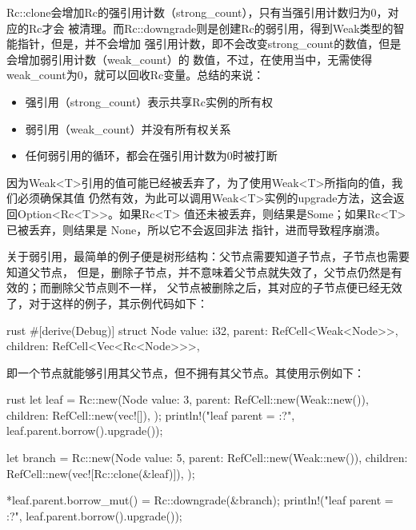 Rc::clone会增加Rc的强引用计数（strong\_count），只有当强引用计数归为0，对应的Rc才会
被清理。而Rc::downgrade则是创建Rc的弱引用，得到Weak类型的智能指针，但是，并不会增加
强引用计数，即不会改变strong\_count的数值，但是会增加弱引用计数（weak\_count）的
数值，不过，在使用当中，无需使得weak\_count为0，就可以回收Rc变量。总结的来说：
\begin{itemize}
  \item 强引用（strong\_count）表示共享Rc实例的所有权
  \item 弱引用（weak\_count）并没有所有权关系
  \item 任何弱引用的循环，都会在强引用计数为0时被打断
\end{itemize}

因为Weak<T>引用的值可能已经被丢弃了，为了使用Weak<T>所指向的值，我们必须确保其值
仍然有效，为此可以调用Weak<T>实例的upgrade方法，这会返回Option<Rc<T>>。如果Rc<T>
值还未被丢弃，则结果是Some；如果Rc<T>已被丢弃，则结果是 None，所以它不会返回非法
指针，进而导致程序崩溃。

关于弱引用，最简单的例子便是树形结构：父节点需要知道子节点，子节点也需要知道父节点，
但是，删除子节点，并不意味着父节点就失效了，父节点仍然是有效的；而删除父节点则不一样，
父节点被删除之后，其对应的子节点便已经无效了，对于这样的例子，其示例代码如下：
\begin{code-block}{rust}
#[derive(Debug)]
struct Node {
    value: i32,
    parent: RefCell<Weak<Node>>,
    children: RefCell<Vec<Rc<Node>>>,
}
\end{code-block}
即一个节点就能够引用其父节点，但不拥有其父节点。其使用示例如下：
\begin{code-block}{rust}
let leaf = Rc::new(Node {
    value: 3,
    parent: RefCell::new(Weak::new()),
    children: RefCell::new(vec![]),
});
println!("leaf parent = {:?}", leaf.parent.borrow().upgrade());

let branch = Rc::new(Node {
    value: 5,
    parent: RefCell::new(Weak::new()),
    children: RefCell::new(vec![Rc::clone(&leaf)]),
});

*leaf.parent.borrow_mut() = Rc::downgrade(&branch);
println!("leaf parent = {:?}", leaf.parent.borrow().upgrade());
\end{code-block}


